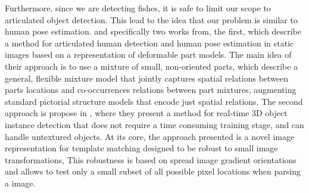 Furthermore, since we are detecting fishes, it is safe to limit our scope to articulated
object detection. This lead to the idea that our problem is similar to human pose
estimation. and specifically two works from, the first, 
\citet{ramanan2012} which describe a method for articulated human detection
and human pose estimation in static images based on a representation of deformable 
part models. The main idea of their approach is to use a mixture of small, non-oriented 
parts, which describe a general, flexible mixture model that jointly captures spatial 
relations between parts locations and co-occurrences relations between part mixtures, 
augmenting standard pictorial structure models that encode just spatial relations. 
The second approach is propose in \citet{Hinterstoisser2012}, where they present 
a method for real-time 3D object instance detection that does not require a time 
consuming training stage, and can handle untextured objects. At its core, the approach 
presented is a novel image representation for template matching designed to be robust 
to small image transformations, This robustness is based on spread image gradient 
orientations and allows to test only a small subset of all possible pixel locations 
when parsing a image. 





